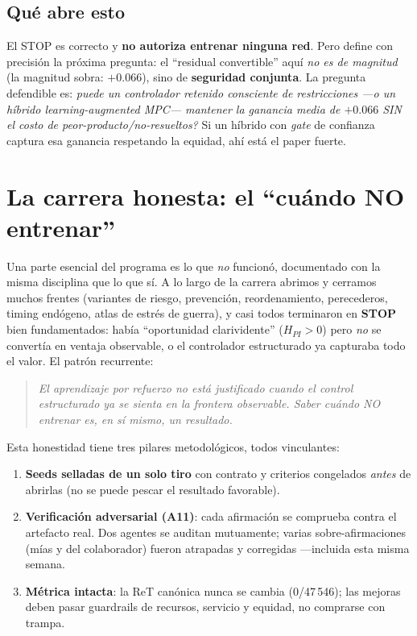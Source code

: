 \documentclass[11pt,a4paper]{article}
\begin{document}
\subsection{Qué abre esto}
El STOP es correcto y \textbf{no autoriza entrenar ninguna red}. Pero define con precisión la próxima
pregunta: el ``residual convertible'' aquí \emph{no es de magnitud} (la magnitud sobra: $+0.066$), sino
de \textbf{seguridad conjunta}. La pregunta defendible es: \emph{\textquestiondown{}puede un controlador retenido
consciente de restricciones —o un híbrido learning-augmented MPC— mantener la ganancia media de
$+0.066$ SIN el costo de peor-producto/no-resueltos?} Si un híbrido con \emph{gate} de confianza captura
esa ganancia respetando la equidad, ahí está el paper fuerte.

\section{La carrera honesta: el ``cuándo NO entrenar''}\label{sec:carrera}
Una parte esencial del programa es lo que \emph{no} funcionó, documentado con la misma disciplina que
lo que sí. A lo largo de la carrera abrimos y cerramos muchos frentes (variantes de riesgo, prevención,
reordenamiento, perecederos, timing endógeno, atlas de estrés de guerra), y casi todos terminaron en
\textbf{STOP} bien fundamentados: había ``oportunidad clarividente'' ($H_{PI}>0$) pero \emph{no} se
convertía en ventaja observable, o el controlador estructurado ya capturaba todo el valor. El patrón
recurrente:
\begin{quote}
\emph{El aprendizaje por refuerzo no está justificado cuando el control estructurado ya se sienta en la
frontera observable. Saber cuándo NO entrenar es, en sí mismo, un resultado.}
\end{quote}
Esta honestidad tiene tres pilares metodológicos, todos vinculantes:
\begin{enumerate}[nosep]
  \item \textbf{Seeds selladas de un solo tiro} con contrato y criterios congelados \emph{antes} de
        abrirlas (no se puede pescar el resultado favorable).
  \item \textbf{Verificación adversarial (A11)}: cada afirmación se comprueba contra el artefacto
        real. Dos agentes se auditan mutuamente; varias sobre-afirmaciones (mías y del colaborador)
        fueron atrapadas y corregidas —incluida esta misma semana.
  \item \textbf{Métrica intacta}: la ReT canónica nunca se cambia (0/47\,546); las mejoras deben
        pasar guardrails de recursos, servicio y equidad, no comprarse con trampa.
\end{enumerate}
\end{document}

